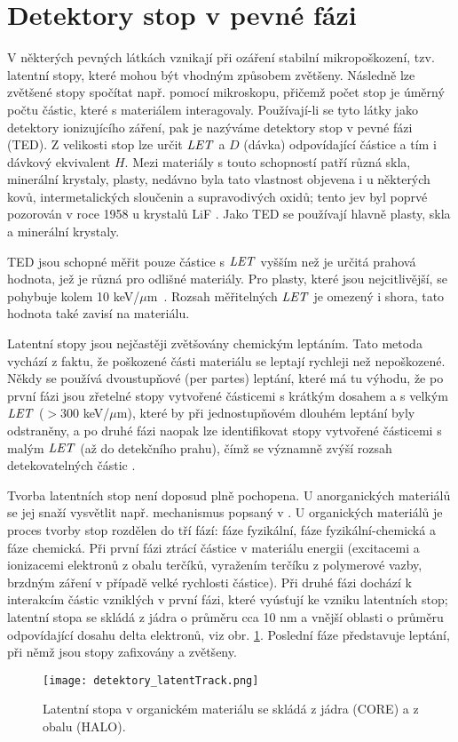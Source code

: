 \section{Detektory stop v pevné fázi}
V některých pevných látkách vznikají při ozáření stabilní mikropoškození, tzv. latentní stopy, které mohou být vhodným způsobem zvětšeny. Následně lze zvětšené stopy spočítat např. pomocí mikroskopu, přičemž počet stop je úměrný počtu částic, které s materiálem interagovaly. Používají-li se tyto látky jako detektory ionizujícího záření, pak je nazýváme detektory stop v pevné fázi (TED). Z velikosti stop lze určit $\mathit{LET}$ a $D$ (dávka) odpovídající částice a tím i dávkový ekvivalent $H$. Mezi materiály s touto schopností patří různá skla, minerální krystaly, plasty, nedávno byla tato vlastnost objevena i u některých kovů, intermetalických sloučenin a supravodivých oxidů; tento jev byl poprvé pozorován v roce 1958 u krystalů LiF \cite{objevTED}. Jako TED
se používají hlavně plasty, skla a minerální krystaly.

TED jsou schopné měřit pouze částice s $\mathit{LET}$ vyšším než je určitá prahová hodnota, jež je různá pro odlišné materiály. Pro plasty, které jsou nejcitlivější, se pohybuje kolem 10 keV/$\mu$m~\cite{ambrozova_dvaExperimenty}. Rozsah měřitelných $\mathit{LET}$ je omezený i shora, tato hodnota také zavisí na materiálu.  

Latentní stopy jsou nejčastěji zvětšovány chemickým leptáním. Tato metoda vychází z faktu, že poškozené části materiálu se leptají rychleji než nepoškozené. Někdy se používá dvoustupňové (per partes) leptání, které má tu výhodu, že po první fázi jsou zřetelné stopy vytvořené částicemi s krátkým dosahem a s velkým $\mathit{LET}$ ($> 300$ keV/$\mu$m), které by při jednostupňovém dlouhém leptání byly odstraněny, a po druhé fázi naopak lze identifikovat stopy vytvořené částicemi s malým $\mathit{LET}$ (až do detekčního prahu), čímž se významně zvýší rozsah detekovatelných částic \cite{cesky}. 

Tvorba latentních stop není doposud plně pochopena. U anorganických materiálů se jej snaží vysvětlit např. mechanismus popsaný v \cite{spikeModel}. U organických materiálů je proces tvorby stop rozdělen do tří fází: fáze fyzikální, fáze fyzikální-chemická a fáze chemická. Při první fázi ztrácí částice v materiálu energii (excitacemi a ionizacemi elektronů z obalu terčíků, vyražením terčíku z polymerové vazby, brzdným záření v případě velké rychlosti částice). Při druhé fázi dochází k interakcím částic vzniklých v první fázi, které vyúsťují ke vzniku latentních stop; latentní stopa se skládá z jádra o průměru cca 10 nm a vnější oblasti o průměru odpovídající dosahu delta elektronů, viz obr. \ref{fig:detektory_latentTrack}. Poslední fáze představuje leptání, při němž jsou stopy zafixovány
a zvětšeny.~\cite{thesisKPBrabcova} 
\begin{figure}[h]
  \centering
  \texttt{[image: detektory\_latentTrack.png]}
  \caption{Latentní stopa v organickém materiálu se skládá z jádra (CORE) a z obalu (HALO). \cite{thesisKPBrabcova}}
  \label{fig:detektory_latentTrack}
\end{figure}

